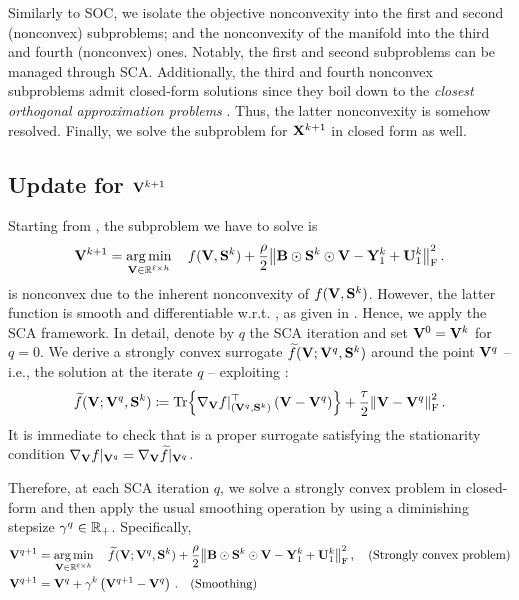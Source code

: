 Similarly to SOC, we isolate the objective nonconvexity into the first and second (nonconvex) subproblems; and the nonconvexity of the manifold into the third and fourth (nonconvex) ones.
Notably, the first and second subproblems can be managed through SCA. 
Additionally, the third and fourth nonconvex subproblems admit closed-form solutions since they boil down to the \emph{closest orthogonal
approximation problems} .
Thus, the latter nonconvexity is somehow resolved.
Finally, we solve the subproblem for $\mathbf{X}^{k+1}$ in closed form as well.

\subsection{\texorpdfstring{Update for $\mathbf{V}^{k+1}$}{Update for V}}\label{subsec:updateV_partial}
Starting from , the subproblem we have to solve is
\begin{equation}\label{eq:updateV_nonconvex_partial}
    \mathbf{V}^{k+1}=\operatorname*{arg\,min}_{\mathbf{V} \in \mathbb{R}^{\ell \times h}}\quad f(\mathbf{V},\mathbf{S}^k) + \frac{\rho}{2}\norm{\mathbf{B}\odot\mathbf{S}^k\odot\mathbf{V} - \mathbf{Y}_1^k +\mathbf{U}_1^k}_{\mathrm{F}}^2\,.
\end{equation}
 is nonconvex due to the inherent nonconvexity of $f(\mathbf{V},\mathbf{S}^k)$.
However, the latter function is smooth and differentiable w.r.t. \V, as given in .
Hence, we apply the SCA framework.
In detail, denote by $q$ the SCA iteration and set $\mathbf{V}^0=\mathbf{V}^k$ for $q=0$.
We derive a strongly convex surrogate $\widetilde{f}(\mathbf{V};\mathbf{V}^q, \mathbf{S}^k)$ around the point $\mathbf{V}^q$ -- i.e., the solution at the iterate $q$ -- exploiting :
\begin{equation}\label{eq:strongly_convex_surrogate_Vpartial}
    \widetilde{f}(\V;\V^q, \Supp^k) \coloneqq \Tr{\Egrad{\V}{f}\at{(\V^q, \Supp^k)}^\top \left(\V - \V^q\right)} + \frac{\tau}{2}\frob{\V -\V^q}^2\,.
\end{equation}
It is immediate to check that  is a proper surrogate satisfying the stationarity condition $\nabla_{\mathbf{V}} f|_{\mathbf{V}^q}=\nabla_{\mathbf{V}} \widetilde{f}|_{\mathbf{V}^q}$.

Therefore, at each SCA iteration $q$, we solve a strongly convex problem in closed-form and then apply the usual smoothing operation by using a diminishing stepsize $\gamma^q \in \mathbb{R}_+$.
Specifically,
\begin{equation}\label{eq:SCA_recursion_V}
    \begin{aligned}        
        \mathbf{V}^{q+1} &= \operatorname*{arg\,min}_{\mathbf{V} \in \mathbb{R}^{\ell \times h}}\quad \widetilde{f}(\mathbf{V};\mathbf{V}^q, \mathbf{S}^k) +\frac{\rho}{2}\norm{\mathbf{B}\odot\mathbf{S}^k\odot\mathbf{V} - \mathbf{Y}_1^k +\mathbf{U}_1^k}_{\mathrm{F}}^2\,, \quad\textrm{(Strongly convex problem)}\\
        \mathbf{V}^{q+1} &= \mathbf{V}^q + \gamma^k\left(\mathbf{V}^{q+1}-\mathbf{V}^q\right)\,. \quad\textrm{(Smoothing)}
    \end{aligned}
\end{equation}

